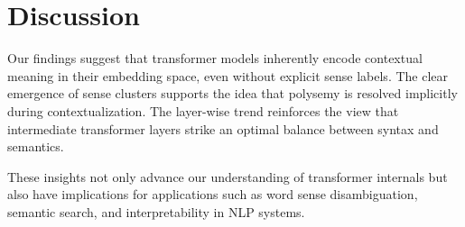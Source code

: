 \documentclass{template}
\begin{document}
\section*{Discussion}
Our findings suggest that transformer models inherently encode contextual meaning in their embedding space, even without explicit sense labels. The clear emergence of sense clusters supports the idea that polysemy is resolved implicitly during contextualization. The layer-wise trend reinforces the view that intermediate transformer layers strike an optimal balance between syntax and semantics.

These insights not only advance our understanding of transformer internals but also have implications for applications such as word sense disambiguation, semantic search, and interpretability in NLP systems.

\newpage


\makereferences
\end{document}
